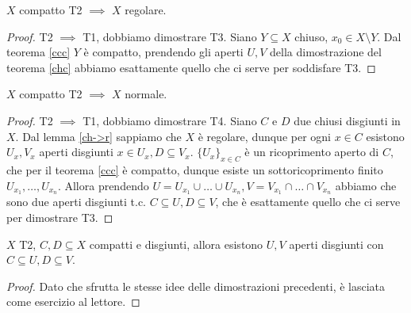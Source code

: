 \begin{lm} \label{ch->r}
  $X$ compatto T2 $\implies$ $X$ regolare.
\end{lm}

\begin{proof}
  T2 $\implies$ T1, dobbiamo dimostrare T3. Siano $Y \subseteq X$ chiuso, $x_0 \in X \setminus Y$. Dal teorema \ref{ccc} $Y$ è compatto, prendendo gli aperti $U, V$ della dimostrazione del teorema \ref{chc} abbiamo esattamente quello che ci serve per soddisfare T3.
\end{proof}

\begin{thm} \label{ch->n}
  $X$ compatto T2 $\implies$ $X$ normale.
\end{thm}

\begin{proof}
  T2 $\implies$ T1, dobbiamo dimostrare T4. Siano $C$ e $D$ due chiusi disgiunti in $X$. Dal lemma \ref{ch->r} sappiamo che $X$ è regolare, dunque per ogni $x \in C$ esistono $U_x, V_x$ aperti disgiunti $x \in U_x, D \subseteq V_x$. $\{U_x\}_{x \in C}$ è un ricoprimento aperto di $C$, che per il teorema \ref{ccc} è compatto, dunque esiste un sottoricoprimento finito $U_{x_1}, \dots, U_{x_n}$.
  Allora prendendo $U=U_{x_1} \cup \dots \cup U_{x_n}, V=V_{x_1} \cap \dots \cap V_{x_n}$ abbiamo che sono due aperti disgiunti t.c. $C \subseteq U, D \subseteq V$, che è esattamente quello che ci serve per dimostrare T3.
\end{proof}

\begin{prop}
  $X$ T2, $C, D \subseteq X$ compatti e disgiunti, allora esistono $U, V$ aperti disgiunti con $C \subseteq U, D \subseteq V$.
\end{prop}

\begin{proof}
  Dato che sfrutta le stesse idee delle dimostrazioni precedenti, è lasciata come esercizio al lettore.
\end{proof}
